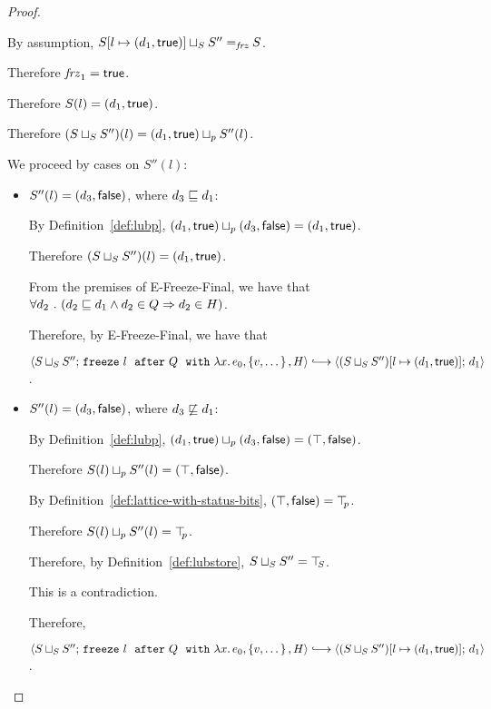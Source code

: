 \begin{proof}
\begin{itemize}
\begin{itemize}
        By assumption, $S[l \mapsto (d_1, \textsf{true})] \sqcup_{S} S''
        =_{\textit{frz}} S$.

        Therefore $\mathit{frz}_1 = \textsf{true}$.

        Therefore $S(l) = (d_1, \textsf{true})$.

        Therefore $(S \sqcup_{S} S'')(l) =
        (d_1, \textsf{true}) \sqcup_p S''(l)$.

        We proceed by cases on $S''(l)$:
        \begin{itemize}
        \item $S''(l) = (d_3, \textsf{false})$, where $d_3 \sqsubseteq d_1$:

          By Definition~\ref{def:lubp},
          $(d_1, \textsf{true}) \sqcup_p (d_3, \textsf{false})
          = (d_1, \textsf{true})$.

          Therefore $(S \sqcup_{S} S'')(l) =
          (d_1, \textsf{true})$.

          From the premises of {\sc E-Freeze-Final}, we have that
          $\forall{d_2} ~.~ ( {d_2 \sqsubseteq d_1 \land d_2 \in Q} \Rightarrow d_2 \in
          H)$.

          Therefore, by {\sc E-Freeze-Final}, we have that

          $\config{\lubstore{S}{S''}}{\freezeafterfull{l}{Q}{\lam{x}{e_0}}{\setof{v,
                \dots}}{H}} \parstepsto
          \config{\extS{(\lubstore{S}{S''})}{l}{d_1}{\frozentrue}}{d_1}$.

        \item $S''(l) = (d_3, \textsf{false})$, where $d_3 \not \sqsubseteq d_1$:

          By Definition~\ref{def:lubp},
          $(d_1, \textsf{true}) \sqcup_p (d_3, \textsf{false})
          = (\top, \textsf{false})$.

          Therefore $S(l) \sqcup_p S''(l) =
          (\top, \textsf{false})$.

          By Definition~\ref{def:lattice-with-status-bits},
          $(\top, \textsf{false}) = \top\hspace{-0.85mm}_{p}$.

          Therefore $S(l) \sqcup_p S''(l) = \top\hspace{-0.85mm}_{p}$.

          Therefore, by Definition~\ref{def:lubstore},
          $S \sqcup_{S} S'' = \top\hspace{-0.85mm}_{S}$.

          This is a contradiction.

          Therefore,

          $\config{\lubstore{S}{S''}}{\freezeafterfull{l}{Q}{\lam{x}{e_0}}{\setof{v,
                \dots}}{H}} \parstepsto
          \config{\extS{(\lubstore{S}{S''})}{l}{d_1}{\frozentrue}}{d_1}$.


\end{itemize}
\end{itemize}
\end{itemize}
\end{proof}
